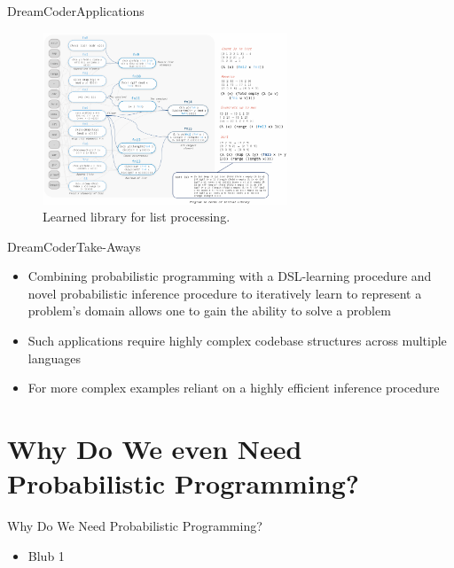 \documentclass[AERbeamer%
              ,optEnglish%
              ,optBiber%
              ,optBibstyleAlphabetic%
              ,optBeamerClassicFormat%
              ]{AERlatex}%
\begin{document}
\begin{frame}[c]{DreamCoder}{Applications}
    \centering
    \begin{figure}
        \centering
        \includegraphics[width=0.65\textwidth]{DreamCoderApplication4.png}
        \caption{Learned library for list processing.}
    \end{figure}
\end{frame}


\begin{frame}[c]{DreamCoder}{Take-Aways}
    \centering
    \begin{itemize}
        \item Combining probabilistic programming with a DSL-learning procedure and novel probabilistic inference procedure
              to iteratively learn to represent a problem's domain allows one to gain the ability to solve a problem
        \item Such applications require highly complex codebase structures across multiple languages
        \item For more complex examples reliant on a highly efficient inference procedure
    \end{itemize}
\end{frame}




\section{Why Do We even Need Probabilistic Programming?}


\begin{frame}[c]{Why Do We Need Probabilistic Programming?}
    \centering
    \begin{itemize}
        \item Blub 1
    \end{itemize}
\end{frame}
\end{document}
